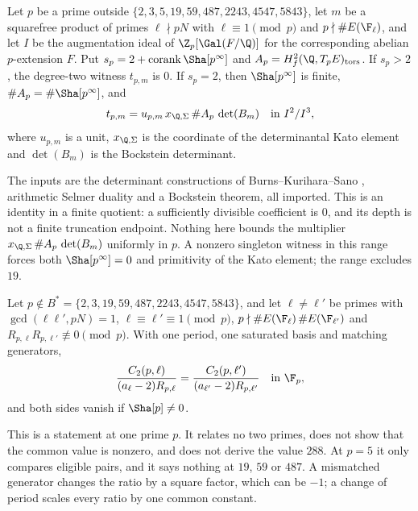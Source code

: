 \begin{researchrecord}\label{thm:katofact}
Let $p$ be a prime outside $\{2,3,5,19,59,487,2243,4547,5843\}$, let $m$ be a squarefree product of primes $\ell\nmid pN$ with $\ell\equiv1\pmod p$ and $p\nmid\#E(\F_\ell)$, and let $I$ be the augmentation ideal of $\Z_p[\Gal(F/\Q)]$ for the corresponding abelian $p$-extension $F$. Put $s_p=2+\operatorname{corank}\Sha[p^\infty]$ and $A_p=H^2_f(\Q,T_pE)_{\mathrm{tors}}$. If $s_p>2$, the degree-two witness $t_{p,m}$ is $0$. If $s_p=2$, then $\Sha[p^\infty]$ is finite, $\#A_p=\#\Sha[p^\infty]$, and
\[
t_{p,m}=u_{p,m}\,x_{\Q,\Sigma}\,\#A_p\,\det(B_m)\quad\text{in }I^2/I^3,
\]
where $u_{p,m}$ is a unit, $x_{\Q,\Sigma}$ is the coordinate of the determinantal Kato element and $\det(B_m)$ is the Bockstein determinant.
\end{researchrecord}
The inputs are the determinant constructions of Burns--Kurihara--Sano \cite{bks}, arithmetic Selmer duality and a Bockstein theorem, all imported. This is an identity in a finite quotient: a sufficiently divisible coefficient is $0$, and its depth is not a finite truncation endpoint. Nothing here bounds the multiplier $x_{\Q,\Sigma}\,\#A_p\,\det(B_m)$ uniformly in $p$. A nonzero singleton witness in this range forces both $\Sha[p^\infty]=0$ and primitivity of the Kato element; the range excludes $19$.

\begin{researchrecord}\label{thm:w}
Let $p\notin B^*=\{2,3,19,59,487,2243,4547,5843\}$, and let $\ell\neq\ell'$ be primes with $\gcd(\ell\ell',pN)=1$, $\ell\equiv\ell'\equiv1\pmod p$, $p\nmid\#E(\F_\ell)\,\#E(\F_{\ell'})$ and $R_{p,\ell}R_{p,\ell'}\not\equiv0\pmod p$. With one period, one saturated basis and matching generators,
\[
\frac{C_2(p,\ell)}{(a_\ell-2)R_{p,\ell}}=\frac{C_2(p,\ell')}{(a_{\ell'}-2)R_{p,\ell'}}\quad\text{in }\F_p ,
\]
and both sides vanish if $\Sha[p]\ne0$.
\end{researchrecord}
This is a statement at one prime $p$. It relates no two primes, does not show that the common value is nonzero, and does not derive the value $288$. At $p=5$ it only compares eligible pairs, and it says nothing at $19$, $59$ or $487$. A mismatched generator changes the ratio by a square factor, which can be $-1$; a change of period scales every ratio by one common constant.
